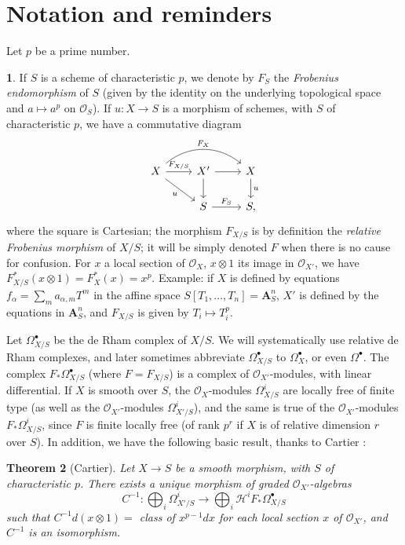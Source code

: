 \documentclass[10pt,reqno]{article}
\newcommand{\mbold}{\mathbf}
\newcommand{\HH}{\mathcal{H}}
\renewcommand{\O}{\mathcal{O}}
\newcommand{\ah}{^\ast}
\newcommand{\al}{_\ast}
\newcommand{\bh}{^\bullet}
\theoremstyle{plain}
\newtheorem{thm}{Theorem}[section]
\theoremstyle{definition}
\newtheorem{blk}[thm]{}
\begin{document}
\section{Notation and reminders}

\noindent
Let $p$ be a prime number.

\begin{blk}
If $S$ is a scheme of characteristic $p$, we denote by $F_S$ the
\emph{Frobenius endomorphism} of $S$ (given by the identity on the underlying topological space and
$a\mapsto a^p$ on $\O_S$). If $u:X\to S$ is a morphism of schemes, with $S$ of characteristic $p$,
we have a commutative diagram
\[
  \begin{tikzcd}
  X\ar[r,"F_{X/S}"]\ar[rr,"F_X",bend left=40]\ar[rd,"u"'] & X'\ar[r]\ar[d] & X\ar[d,"u"]\\
  & S\ar[r,"F_S"] & S,
  \end{tikzcd}
\]
where the square is Cartesian; the morphism $F_{X/S}$ is by definition the
\emph{relative Frobenius morphism} of $X/S$; it will be simply denoted $F$ when there is no cause
for confusion. For $x$ a local section of $\O_X$, $x\otimes 1$ its image in $\O_{X'}$, we have
$F_{X/S}\ah(x\otimes 1)=F_X\ah(x)=x^p$. Example: if $X$ is defined by equations
$f_\alpha=\sum_m a_{\alpha,m}T^m$ in the affine space $S[T_1,\dots,T_n]=\mbold{A}_S^n$, $X'$ is defined by
the equations  in $\mbold{A}_S^n$, and $F_{X/S}$ is given by
$T_i\mapsto T_i^p$.
\end{blk}

Let $\Omega_{X/S}\bh$ be the de Rham complex of $X/S$. We will systematically use
relative de Rham complexes, and later sometimes abbreviate $\Omega_{X/S}\bh$ to $\Omega_X\bh$,
or even $\Omega\bh$. The complex $F\al\Omega_{X/S}\bh$ (where $F=F_{X/S}$) is a complex of
$\O_{X'}$-modules, with linear differential. If $X$ is smooth over $S$, the $\O_X$-modules
$\Omega_{X/S}^i$ are locally free of finite type (as well as the $\O_{X'}$-modules $\Omega_{X'/S}^i$),
and the same is true of the $\O_{X'}$-modules $F\al\Omega_{X/S}^i$, since $F$ is finite locally free
(of rank $p^r$ if $X$ is of relative dimension $r$ over $S$). In addition, we have the following basic
result, thanks to Cartier \cite{4}:
\begin{thm}[Cartier]
Let $X\to S$ be a smooth morphism, with $S$ of characteristic $p$. There exists a unique morphism
of graded $\O_{X'}$-algebras
\[
  C^{-1}:\bigoplus_i\Omega_{X'/S}^i\longrightarrow\bigoplus_i\HH^i F\al\Omega_{X/S}\bh
\]
such that $C^{-1}d(x\otimes 1)=$ class of $x^{p-1}dx$ for each local section $x$ of $\O_{X'}$,
and $C^{-1}$ is an isomorphism.
\end{thm}
\end{document}
